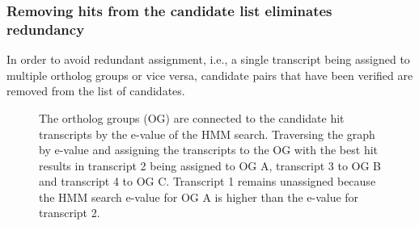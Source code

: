 

\subsubsection{Removing hits from the candidate list eliminates redundancy}

In order to avoid redundant assignment, i.e., a single transcript being assigned
to multiple ortholog groups or vice versa, candidate pairs that have been
verified are removed from the list of candidates. 

\begin{figure}[ht]
	\def\svgwidth{0.8\textwidth}
	
	\caption[Non-redundant assignment]{The ortholog groups (OG) are connected to
		the candidate hit transcripts by the e-value of the HMM search. Traversing
		the graph by e-value and assigning the transcripts to the OG with the best
		hit results in transcript 2 being assigned to OG A, transcript 3 to OG B and
		transcript 4 to OG C. Transcript 1 remains unassigned because the HMM search
		e-value for OG A is higher than the e-value for transcript 2.}
	\label{fig:orthograph-graph}
\end{figure}
